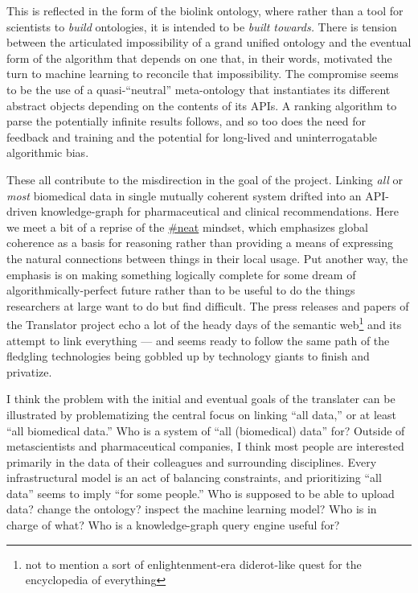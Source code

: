 \documentclass[notoc]{tufte-book}
\begin{document}
This is reflected in the form of the biolink ontology, where rather than
a tool for scientists to \emph{build} ontologies, it is intended to be
\emph{built towards.} There is tension between the articulated
impossibility of a grand unified ontology and the eventual form of the
algorithm that depends on one that, in their words, motivated the turn
to machine learning to reconcile that impossibility. The compromise
seems to be the use of a quasi-``neutral'' meta-ontology that
instantiates its different abstract objects depending on the contents of
its APIs. A ranking algorithm to parse the potentially infinite results
follows, and so too does the need for feedback and training and the
potential for long-lived and uninterrogatable algorithmic bias.

These all contribute to the misdirection in the goal of the project.
Linking \emph{all} or \emph{most} biomedical data in single mutually
coherent system drifted into an API-driven knowledge-graph for
pharmaceutical and clinical recommendations. Here we meet a bit of a
reprise of the \protect\hyperlink{neatness-vs-scruffiness}{\#neat}
mindset, which emphasizes global coherence as a basis for reasoning
rather than providing a means of expressing the natural connections
between things in their local usage. Put another way, the emphasis is on
making something logically complete for some dream of
algorithmically-perfect future rather than to be useful to do the things
researchers at large want to do but find difficult. The press releases
and papers of the Translator project echo a lot of the heady days of the
semantic web\footnote{not to mention a sort of enlightenment-era
  diderot-like quest for the encyclopedia of everything} and its attempt
to link everything --- and seems ready to follow the same path of the
fledgling technologies being gobbled up by technology giants to finish
and privatize.

I think the problem with the initial and eventual goals of the
translater can be illustrated by problematizing the central focus on
linking ``all data,'' or at least ``all biomedical data.'' Who is a
system of ``all (biomedical) data'' for? Outside of metascientists and
pharmaceutical companies, I think most people are interested primarily
in the data of their colleagues and surrounding disciplines. Every
infrastructural model is an act of balancing constraints, and
prioritizing ``all data'' seems to imply ``for some people.'' Who is
supposed to be able to upload data? change the ontology? inspect the
machine learning model? Who is in charge of what? Who is a
knowledge-graph query engine useful for?
\end{document}
